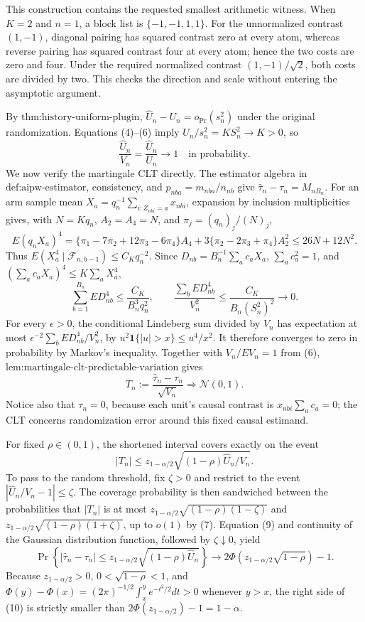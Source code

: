 This construction contains the requested smallest arithmetic witness. When \(K=2\) and \(n=1\), a block list is \(\{-1,-1,1,1\}\). For the unnormalized contrast \((1,-1)\), diagonal pairing has squared contrast zero at every atom, whereas reverse pairing has squared contrast four at every atom; hence the two costs are zero and four. Under the required normalized contrast \((1,-1)/\sqrt2\), both costs are divided by two. This checks the direction and scale without entering the asymptotic argument.

By \(\text{thm:history-uniform-plugin}\), \(\widehat U_n-U_n=o_{\Pr}(s_n^2)\) under the original randomization. Equations (4)--(6) imply \(U_n/s_n^2=KS_n^2\to K>0\), so
\[
 \frac{\widehat U_n}{V_n}=\frac{\widehat U_n}{U_n}\longrightarrow1
 \quad\text{in probability}. \tag{7}
\]
We now verify the martingale CLT directly. The estimator algebra in \(\text{def:aipw-estimator}\), consistency, and \(p_{nba}=m_{nba}/n_{nb}\) give \(\widehat\tau_n-\tau_n=M_{nB_n}\). For an arm sample mean \(X_a=q_n^{-1}\sum_{i:Z_{nbi}=a}x_{nbi}\), expansion by inclusion multiplicities gives, with \(N=Kq_n\), \(A_2=A_4=N\), and \(\pi_j=(q_n)_j/(N)_j\),
\[
 E(q_nX_a)^4
 =\{\pi_1-7\pi_2+12\pi_3-6\pi_4\}A_4
 +3\{\pi_2-2\pi_3+\pi_4\}A_2^2
 \le26N+12N^2.
\]
Thus \(E(X_a^4\mid\mathcal F_{n,b-1})\le C_Kq_n^{-2}\). Since \(D_{nb}=B_n^{-1}\sum_ac_aX_a\), \(\sum_ac_a^2=1\), and \((\sum_ac_aX_a)^4\le K\sum_aX_a^4\),
\[
 \sum_{b=1}^{B_n}E D_{nb}^4
 \le \frac{C_K}{B_n^3q_n^2},
 \qquad
 \frac{\sum_bE D_{nb}^4}{V_n^2}
 \le \frac{C_K}{B_n(S_n^2)^2}\longrightarrow0. \tag{8}
\]
For every \(\epsilon>0\), the conditional Lindeberg sum divided by \(V_n\) has expectation at most \(\epsilon^{-2}\sum_bED_{nb}^4/V_n^2\), by \(u^2\mathbf 1\{|u|>x\}\le u^4/x^2\). It therefore converges to zero in probability by Markov's inequality. Together with \(V_n/EV_n=1\) from (6), \(\text{lem:martingale-clt-predictable-variation}\) gives
\[
 T_n:=\frac{\widehat\tau_n-\tau_n}{\sqrt{V_n}}
 \Rightarrow\mathcal N(0,1). \tag{9}
\]
Notice also that \(\tau_n=0\), because each unit's causal contrast is \(x_{nbi}\sum_ac_a=0\); the CLT concerns randomization error around this fixed causal estimand.

For fixed \(\rho\in(0,1)\), the shortened interval covers exactly on the event
\[
 |T_n|\le z_{1-\alpha/2}
 \sqrt{(1-\rho)\widehat U_n/V_n}.
\]
To pass to the random threshold, fix \(\zeta>0\) and restrict to the event \(|\widehat U_n/V_n-1|\le\zeta\). The coverage probability is then sandwiched between the probabilities that \(|T_n|\) is at most \(z_{1-\alpha/2}\sqrt{(1-\rho)(1-\zeta)}\) and \(z_{1-\alpha/2}\sqrt{(1-\rho)(1+\zeta)}\), up to \(o(1)\) by (7). Equation (9) and continuity of the Gaussian distribution function, followed by \(\zeta\downarrow0\), yield
\[
 \Pr\!\left\{|\widehat\tau_n-\tau_n|\le z_{1-\alpha/2}
 \sqrt{(1-\rho)\widehat U_n}\right\}
 \longrightarrow
 2\Phi\!\left(z_{1-\alpha/2}\sqrt{1-\rho}\right)-1. \tag{10}
\]
Because \(z_{1-\alpha/2}>0\), \(0<\sqrt{1-\rho}<1\), and \(\Phi(y)-\Phi(x)=(2\pi)^{-1/2}\int_x^y e^{-t^2/2}dt>0\) whenever \(y>x\), the right side of (10) is strictly smaller than \(2\Phi(z_{1-\alpha/2})-1=1-\alpha\).


